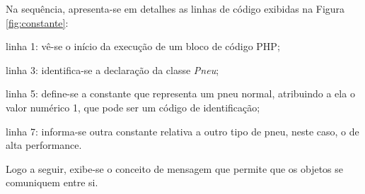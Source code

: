 \FloatBarrier 	%

Na sequência, apresenta-se em detalhes as linhas de código exibidas na Figura
\ref{fig:constante}:

\begin{alineas}
    \item linha 1: vê-se o início da execução de um bloco de código PHP;
    \item linha 3: identifica-se a declaração da classe \textit{Pneu};
    \item linha 5: define-se a constante que representa um pneu normal,
    atribuindo a ela o valor numérico 1, que pode ser um código de
    identificação;
    \item linha 7: informa-se outra constante relativa a outro tipo de pneu,
    neste caso, o de alta performance.
\end{alineas}

Logo a seguir, exibe-se o conceito de mensagem que permite que os
objetos se comuniquem entre si.
